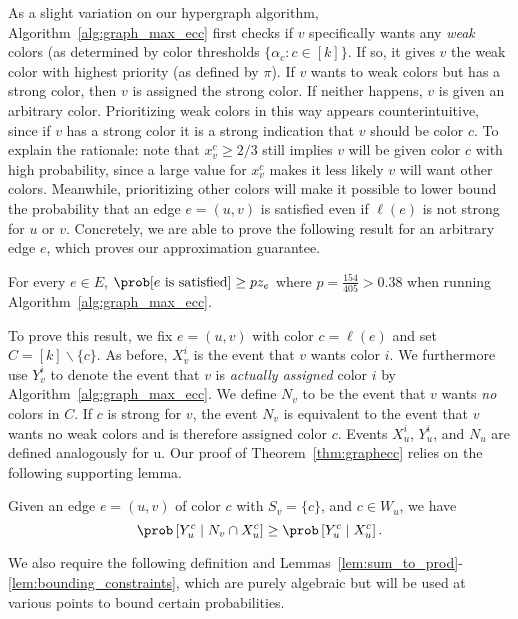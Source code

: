 As a slight variation on our hypergraph algorithm, Algorithm~\ref{alg:graph_max_ecc} first checks if $v$ specifically wants any \emph{weak} colors (as determined by color thresholds $\{\alpha_c \colon c \in [k]\}$. If so, it gives $v$ the weak color with highest priority (as defined by $\pi$). If $v$ wants to weak colors but has a strong color, then $v$ is assigned the strong color. If neither happens, $v$ is given an arbitrary color. 
%
Prioritizing weak colors in this way appears counterintuitive, since if $v$ has a strong color it is a strong indication that $v$ should be color $c$. To explain the rationale: note that $x_v^c \geq 2/3$ still implies $v$ will be given color $c$ with high probability, since a large value for $x_v^c$ makes it less likely $v$ will want other colors. Meanwhile, prioritizing other colors will make it possible to lower bound the probability that an edge $e = (u,v)$ is satisfied even if $\ell(e)$ is not strong for $u$ or $v$.
Concretely, we are able to prove the following result for an arbitrary edge $e$, which proves our approximation guarantee.
\begin{theorem}
	\label{thm:graphecc}
	For every $e \in E$, $\prob[\text{$e$ is satisfied}] \geq p z_e$ where $p = \frac{154}{405} > 0.38$ when running Algorithm~\ref{alg:graph_max_ecc}.
\end{theorem}
To prove this result, we fix $e = (u,v)$ with color $c = \ell(e)$ and set $C = [k] \backslash \{c\}$. As before, $X_v^i$ is the event that $v$ wants color $i$. We furthermore use $Y_v^i$ to denote the event that $v$ is \emph{actually assigned} color $i$ by Algorithm~\ref{alg:graph_max_ecc}. We define $N_v$ to be the event that $v$ wants \emph{no} colors in $C$. If $c$ is strong for $v$, the event $N_v$ is equivalent to the event that $v$ wants no weak colors and is therefore assigned color $c$. Events $X_u^i$, $Y_u^i$, and $N_u$ are defined analogously for u. Our proof of Theorem~\ref{thm:graphecc} relies on the following supporting lemma.
\begin{lemma}
	\label{lem:dependent_y_n_x}
	Given an edge $e = (u,v)$ of color $c$ {with \color{blue} $S_v = \{c\}$, and $c \in W_u$,} we have
	\[
	\prob\left[Y_u^c \mid N_v \cap X_u^c\right] \geq \prob\left[Y_u^c \mid X_u^c\right].
	\]
\end{lemma}
We also require the following definition and Lemmas~\ref{lem:sum_to_prod}-\ref{lem:bounding_constraints}, which are purely algebraic but will be used at various points to bound certain probabilities. 

